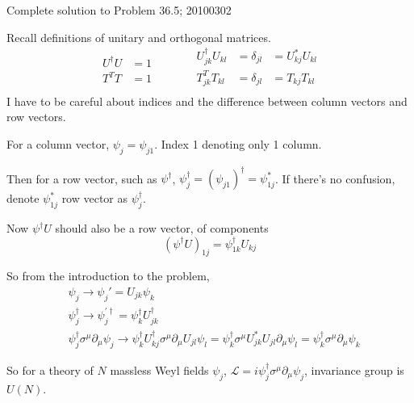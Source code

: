 \documentclass[twoside]{amsart}
\begin{document}
\hrulefill

Complete solution to Problem 36.5; 20100302 

Recall definitions of unitary and orthogonal matrices.  
\[
\begin{aligned}
  U^{\dag} U & = 1 \\ 
  T^T T & =1 
\end{aligned} \quad \quad \quad \, \begin{aligned}
  U^{\dag}_{jk} U_{kl} & = \delta_{jl} & = U^*_{kj} U_{kl} \\ 
  T^{T}_{jk} T_{kl} & = \delta_{jl} & = T_{kj} T_{kl} \\ 
\end{aligned}
\]
I have to be careful about indices and the difference between column vectors and row vectors.  

For a column vector, $\psi_j = \psi_{j1}$.  Index 1 denoting only 1 column.  

Then for a row vector, such as $\psi^{\dag}$, 
\phantom{Then} $\psi_j^{\dag} = (\psi_{j1})^{\dag} = \psi_{1j}^*$.  If there's no confusion, denote $\psi_{1j}^*$ row vector as $\psi_j^{\dag}$.  

Now $\psi^{\dag} U$ should also be a row vector, of components
\[
(\psi^{\dag} U)_{1j} = \psi^{\dag}_{1k} U_{kj}
\]

So from the introduction to the problem, 
\[
\begin{aligned}
  & \psi_j \to \psi_j' = U_{jk} \psi_k \\ 
  & \psi_j^{\dag} \to \psi^{' \dag }_j = \psi^{\dag}_k U^{\dag}_{jk} \\
  & \psi_j^{\dag} \sigma^{\mu} \partial_{\mu} \psi_j \to \psi_k^{\dag} U_{kj}^{\dag} \sigma^{\mu} \partial_{\mu} U_{jl} \psi_l = \psi_k^{\dag} \sigma^{\mu}  U_{jk}^* U_{jl} \partial_{\mu} \psi_l = \psi_k^{\dag} \sigma^{\mu} \partial_{\mu} \psi_k 
\end{aligned}
\]

So for a theory of $N$ massless Weyl fields $\psi_j$, $\mathcal{L} = i \psi_j^{\dag} \sigma^{\mu} \partial_{\mu} \psi_j$, invariance group is $U(N)$.  
\end{document}
